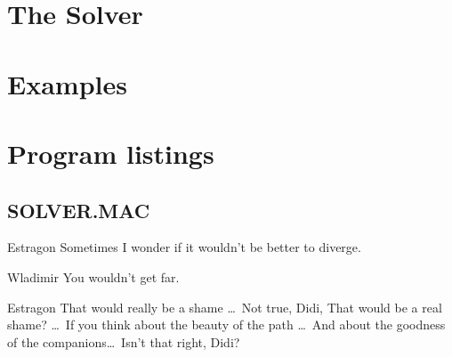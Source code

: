 \documentclass[11pt]{report}           %
\begin{document}
\cleardoublepage
\chapter{The Solver}



\cleardoublepage
{}


\cleardoublepage
\begin{appendix}
{\raggedbottom
{}

\chapter{Examples}


\cleardoublepage
\chapter{Program listings}

\section{SOLVER.MAC}

}
\end{appendix}

\cleardoublepage
{%
\thispagestyle{empty}
\parindent-1cm
\parskip\baselineskip
\vspace*{4cm}
\large
{}

{\sc Estragon} Sometimes I wonder if it wouldn't be better to diverge.

{\sc Wladimir} You wouldn't get far.

{\sc Estragon} 
That would really be a shame \ldots\ Not true, Didi,
That would be a real shame? \ldots\ If you think about the beauty of the path
 \ldots\ And about the goodness of the companions\ldots\ Isn't that right, Didi?

}

\end{document}

